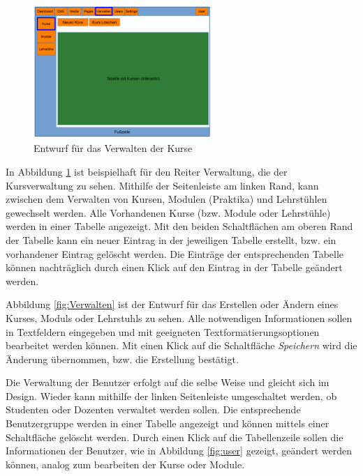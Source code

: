         	\begin{figure}[t]
        		\centering
        		\includegraphics[width=0.6\textwidth]{./design/images/MockUpsBackend/backendManageCourses.png}
        		\caption{Entwurf für das Verwalten der Kurse}
        		\label{fig:mockupManageCourses}
        	\end{figure}
        	
        	In Abbildung \ref{fig:mockupManageCourses} ist beispielhaft für den Reiter Verwaltung, die der Kursverwaltung zu sehen.
        	Mithilfe der Seitenleiste am linken Rand, kann zwischen dem Verwalten von Kursen, Modulen (Praktika) und Lehrstühlen gewechselt werden.
        	Alle Vorhandenen Kurse (bzw. Module oder Lehrstühle) werden in einer Tabelle angezeigt.
        	Mit den beiden Schaltflächen am oberen Rand der Tabelle kann ein neuer Eintrag in der jeweiligen Tabelle erstellt, bzw. ein vorhandener Eintrag gelöscht werden.
        	Die Einträge der entsprechenden Tabelle können nachträglich durch einen Klick auf den Eintrag in der Tabelle geändert werden.
        	
        	Abbildung \ref{fig:Verwalten} ist der Entwurf für das Erstellen oder Ändern eines Kurses, Moduls oder Lehrstuhls zu sehen.
        	Alle notwendigen Informationen sollen in Textfeldern eingegeben und mit geeigneten Textformatierungsoptionen bearbeitet werden können.
        	Mit einen Klick auf die Schaltfläche \textit{Speichern} wird die Änderung übernommen, bzw. die Erstellung bestätigt.
        	
        	Die Verwaltung der Benutzer erfolgt auf die selbe Weise und gleicht sich im Design.
        	Wieder kann mithilfe der linken Seitenleiste umgeschaltet werden, ob Studenten oder Dozenten verwaltet werden sollen.
        	Die entsprechende Benutzergruppe werden in einer Tabelle angezeigt und können mittels einer Schaltfläche gelöscht werden.
        	Durch einen Klick auf die Tabellenzeile sollen die Informationen der Benutzer, wie in Abbildung \ref{fig:user} gezeigt, geändert werden können, analog zum bearbeiten der Kurse oder Module.
        	
